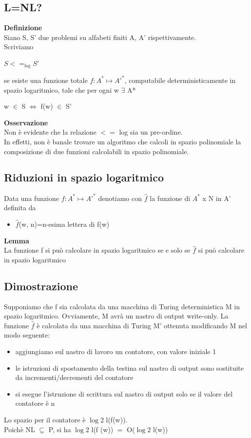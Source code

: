 \subsection{L=NL?}
\textbf{Definizione}\\
Siano S, S' due problemi su alfabeti finiti A, A' rispettivamente.
\\Scriviamo
\begin{center}
    $S <=_{\log} S'$
\end{center}
se esiste una funzione totale $f : A^* \mapsto A'^*$, computabile deterministicamente in spazio logaritmico, tale che per ogni w $\exists$ A*
\begin{center}
    w $\in$ S $\Longleftrightarrow$ f(w) $\in$ S'
\end{center}
\textbf{Osservazione}\\
Non è evidente che la relazione $<=$ log sia un pre-ordine.
\\In effetti, non è banale trovare un algoritmo che calcoli in spazio
polinomiale la composizione di due funzioni calcolabili in spazio polinomiale.
\subsection{Riduzioni in spazio logaritmico}
Data una funzione $f : A^* \mapsto A'^*$ denotiamo con $\hat{f}$ la funzione di $A^*$ x N in A' definita da
\begin{itemize}
    \item $\hat{f}$(w, n)=n-esima lettera di f(w)
\end{itemize}
\textbf{Lemma}\\
La funzione f si può calcolare in spazio logaritmico se e solo se $\hat{f}$ si può calcolare in spazio logaritmico
\subsection{Dimostrazione}
Supponiamo che f sia calcolata da una macchina di Turing deterministica M in spazio logaritmico.
Ovviamente, M avrà un nastro di output write-only. La funzione $\hat{f}$ è calcolata da una macchina di Turing M' ottenuta
modificando M nel modo seguente:
\begin{itemize}
    \item aggiungiamo sul nastro di lavoro un contatore, con valore iniziale 1
    \item le istruzioni di spostamento della testina sul nastro di output sono sostituite da incrementi/decrementi del contatore
    \item si esegue l’istruzione di scrittura sul nastro di output solo se il valore del contatore è n
\end{itemize}
Lo spazio per il contatore è $\log2$ l(f(w)).
\\Poichè NL $\subseteq$ P, si ha $\log2$
l(f (w)) $=$ O($\log2$ l(w))
